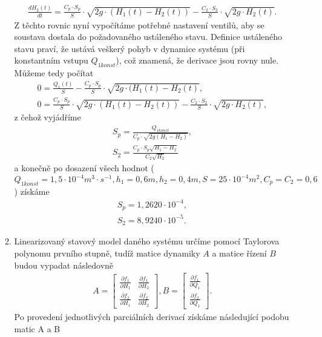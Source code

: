 \documentclass[12pt,a4paper]{article}
\begin{document}
\begin{enumerate}[I.]
\begin{enumerate}[1.]
\begin{gather}
			\frac{dH_2(t)}{dt} = \frac{C_p \cdot S_p}{S} \cdot \sqrt{2g \cdot (H_1(t) - H_2(t))} - \frac{C_2 \cdot S_2}{S} \cdot \sqrt{2g\cdot H_2(t)} \label{dH2}.
			\end{gather}
			Z těchto rovnic nyní vypočítáme potřebné nastavení ventilů, aby se soustava dostala do požadovaného ustáleného stavu. Definice ustáleného stavu praví, že ustává veškerý pohyb v dynamice systému (při konstantním vstupu $ Q_{1konst} $), což znamená, že derivace jsou rovny nule. Můžeme tedy počítat
			\begin{gather*}
			0 = \frac{Q_1(t)}{S} - \frac{C_p \cdot S_p}{S} \cdot \sqrt{2g \cdot (H_1(t) - H_2(t)},\\
			0 = \frac{C_p \cdot S_p}{S} \cdot \sqrt{2g \cdot (H_1(t) - H_2(t))} - \frac{C_2 \cdot S_2}{S} \cdot \sqrt{2g\cdot H_2(t)},
			\end{gather*}
			z čehož vyjádříme
			\begin{gather}
			S_p = \frac{Q_{1konst}}{C_p\cdot \sqrt{2g(H_1 - H_2)}} \label{Sp},\\
			S_2 = \frac{ C_p\cdot S_p \sqrt{H_1 - H_2}}{C_2\sqrt{H_2}} \label{S2}
			\end{gather}
			a konečně po dosazení všech hodnot ($Q_{1konst} = 1,5 \cdot 10^{-4}  m^3 \cdot s^{-1}, h_1 = 0,6 m, h_2 = 0,4m, S = 25 \cdot 10^{-4}m^2, C_p=C_2=0,6 $) získáme
			\begin{gather}
			S_p = 1,2620 \cdot 10^{-4} \label{SpF},\\
			S_2 = 8,9240 \cdot 10^{-5} \label{S2F}.
			\end{gather}
			\item Linearizovaný stavový model daného systému určíme pomocí Taylorova polynomu prvního stupně, tudíž matice dynamiky $ A $ a matice řízení $ B $ budou vypadat následovně
			\begin{gather*}
			A = \left[\begin{array}{cc}
				\frac{\partial f_1}{\partial H_1} & \frac{\partial f_1}{\partial H_2} \\
				\frac{\partial f_2}{\partial H_1} & \frac{\partial f_2}{\partial H_2}
			\end{array}\right],
			B = \left[\begin{array}{c}
				\frac{\partial f_1}{\partial Q_1} \\
				\frac{\partial f_2}{\partial Q_1}
			\end{array}\right].
			\end{gather*}
			Po provedení jednotlivých parciálních derivací získáme následující podobu matic A a B

\end{enumerate}
\end{enumerate}
\end{document}
